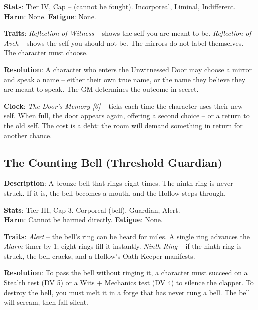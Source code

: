\noindent\textbf{Stats}: Tier IV, Cap -- (cannot be fought). Incorporeal, Liminal, Indifferent.\\
\textbf{Harm}: None. \textbf{Fatigue}: None.

\noindent\textbf{Traits}: 
\emph{Reflection of Witness} -- shows the self you are meant to be. \emph{Reflection of Aveh} -- shows the self you should not be. The mirrors do not label themselves. The character must choose.

\noindent\textbf{Resolution}: A character who enters the Unwitnessed Door may choose a mirror and speak a name -- either their own true name, or the name they believe they are meant to speak. The GM determines the outcome in secret.

\noindent\textbf{Clock}: \emph{The Door's Memory [6]} -- ticks each time the character uses their new self. When full, the door appears again, offering a second choice -- or a return to the old self. The cost is a debt: the room will demand something in return for another chance.

\subsection*{The Counting Bell (Threshold Guardian)}

\noindent\textbf{Description}: A bronze bell that rings eight times. The ninth ring is never struck. If it is, the bell becomes a mouth, and the Hollow steps through.

\noindent\textbf{Stats}: Tier III, Cap 3. Corporeal (bell), Guardian, Alert.\\
\textbf{Harm}: Cannot be harmed directly. \textbf{Fatigue}: None.

\noindent\textbf{Traits}: 
\emph{Alert} -- the bell's ring can be heard for miles. A single ring advances the \emph{Alarm} timer by 1; eight rings fill it instantly. \emph{Ninth Ring} -- if the ninth ring is struck, the bell cracks, and a Hollow's Oath-Keeper manifests.

\noindent\textbf{Resolution}: To pass the bell without ringing it, a character must succeed on a Stealth test (DV 5) or a Wits + Mechanics test (DV 4) to silence the clapper. To destroy the bell, you must melt it in a forge that has never rung a bell. The bell will scream, then fall silent.


